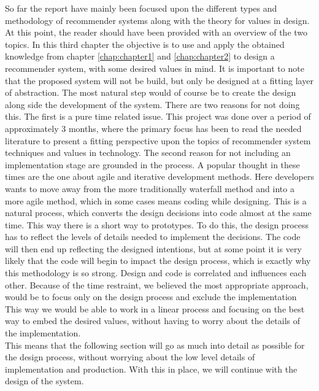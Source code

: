 So far the report have mainly been focused upon the different types and methodology of recommender systems along with the theory for values in design. At this point, the reader should have been provided with an overview of the two topics. In this third chapter the objective is to use and apply the obtained knowledge from chapter \ref{chap:chapter1} and \ref{chap:chapter2} to design a recommender system, with some desired values in mind. It is important to note that the proposed system will not be build, but only be designed at a fitting layer of abstraction. The most natural step would of course be to create the design along side the development of the system. There are two reasons for not doing this. The first is a pure time related issue. This project was done over a period of approximately 3 months, where the primary focus has been to read the needed literature to present a fitting perspective upon the topics of recommender system techniques and values in technology. The second reason for not including an implementation stage are grounded in the process. A popular thought in these times are the one about agile and iterative development methods. Here developers wants to move away from the more traditionally waterfall method and into a more agile method, which in some cases means coding while designing. This is a natural process, which converts the design decisions into code almost at the same time. This way there is a short way to prototypes. To do this, the design process has to reflect the levels of details needed to implement the decisions. The code will then end up reflecting the designed intentions, but at some point it is very likely that the code will begin to impact the design process, which is exactly why this methodology is so strong. Design and code is correlated and influences each other. Because of the time restraint, we believed the most appropriate approach, would be to focus only on the design process and exclude the implementation This way we would be able to work in a linear process and focusing on the best way to embed the desired values, without having to worry about the details of the implementation.\\
This means that the following section will go as much into detail as possible for the design process, without worrying about the low level details of implementation and production. With this in place, we will continue with the design of the system. 


